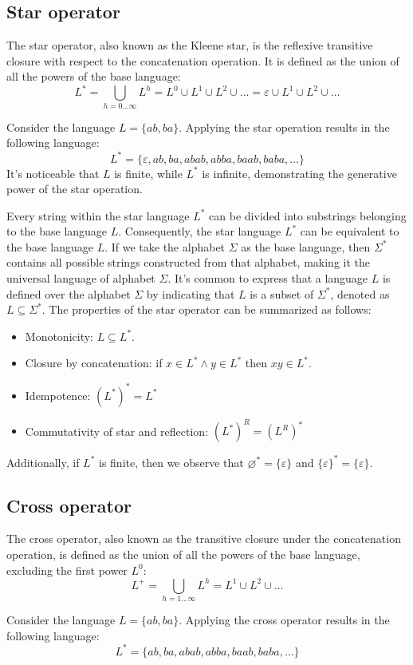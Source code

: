 \subsection*{Star operator} 
The star operator, also known as the Kleene star, is the reflexive transitive closure with respect to the concatenation operation.
It is defined as the union of all the powers of the base language:
\[L^{*}=\bigcup_{h=0\dots\infty}L^h=L^0 \cup L^1 \cup L^2 \cup \dots = \varepsilon \cup L^1 \cup L^2 \cup \dots\]
\begin{example}
    Consider the language $L=\{ab,ba\}$. 
    Applying the star operation results in the following language:
    \[L^{*}=\{\varepsilon, ab, ba, abab, abba, baab, baba, \dots\}\]
    It's noticeable that $L$ is finite, while $L^{*}$ is infinite, demonstrating the generative power of the star operation.
\end{example}
Every string within the star language $L^{*}$ can be divided into substrings belonging to the base language $L$. 
Consequently, the star language $L^{*}$ can be equivalent to the base language $L$. 
If we take the alphabet $\Sigma$ as the base language, then $\Sigma^{*}$ contains all possible strings constructed from that alphabet, making it the universal language of alphabet $\Sigma$.
It's common to express that a language $L$ is defined over the alphabet $\Sigma$ by indicating that $L$ is a subset of $\Sigma^{*}$, denoted as $L \subseteq \Sigma^{*}$. 
The properties of the star operator can be summarized as follows:
\begin{itemize}
    \item Monotonicity: $L \subseteq L^{*}$. 
    \item Closure by concatenation: if $x \in L^{*} \land y \in L^{*}$ then $xy \in L^{*}$. 
    \item Idempotence: $(L^{*})^{*}=L^{*}$
    \item Commutativity of star and reflection: $(L^{*})^R=(L^R)^{*}$
\end{itemize}
Additionally, if $L^{*}$ is finite, then we observe that $\varnothing^{*}=\{\varepsilon\}$ and $\{\varepsilon\}^{*}=\{\varepsilon\}$. 

\subsection*{Cross operator} 
The cross operator, also known as the transitive closure under the concatenation operation, is defined as the union of all the powers of the base language, excluding the first power $L^0$:
\[L^{+}=\bigcup_{h=1\dots\infty}L^h=L^1 \cup L^2 \cup \dots\]
\begin{example}
    Consider the language $L=\{ab,ba\}$. 
    Applying the cross operator results in the following language:
    \[L^{*}=\{ab, ba, abab, abba, baab, baba, \dots\}\]
\end{example}

